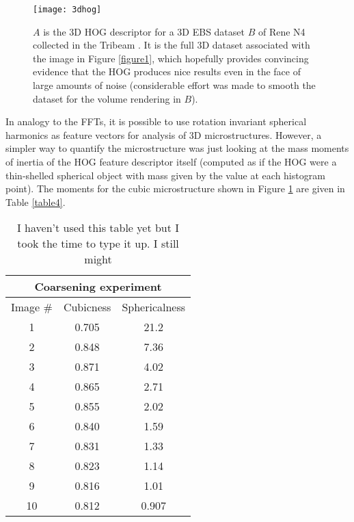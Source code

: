 \documentclass[review]{elsarticle}
\begin{document}
	\begin{figure}[!ht]
  		\centering
    	\texttt{[image: 3dhog]}
  		\caption{ $A$ is the 3D HOG descriptor for a 3D EBS dataset $B$ of Rene N4 collected in the Tribeam \cite{tribeam}. It is the full 3D dataset associated with the image in Figure \ref{figure1}, which hopefully provides convincing evidence that the HOG produces nice results even in the face of large amounts of noise (considerable effort was made to smooth the dataset for the volume rendering in $B$). }
  		\label{figure4}
	\end{figure}

	In analogy to the FFTs, it is possible to use rotation invariant spherical harmonics \cite{spherical} as feature vectors for analysis of 3D microstructures. However, a simpler way to quantify the microstructure was just looking at the mass moments of inertia of the HOG feature descriptor itself (computed as if the HOG were a thin-shelled spherical object with mass given by the value at each histogram point). The moments for the cubic microstructure shown in Figure \ref{figure4} are given in Table \ref{table4}.
	
    \begin{table}[h]
      \begin{center}
      \begin{tabular}{ c | c | c }
        \multicolumn{3}{c}{Coarsening experiment} \\
        \hline
        Image \# & Cubicness & Sphericalness \\
        \hline
        1 & 0.705 & 21.2 \\
        2 & 0.848 & 7.36 \\
        3 & 0.871 & 4.02 \\
        4 & 0.865 & 2.71 \\
        5 & 0.855 & 2.02 \\
        6 & 0.840 & 1.59 \\
        7 & 0.831 & 1.33 \\
        8 & 0.823 & 1.14 \\
        9 & 0.816 & 1.01 \\
        10 & 0.812 & 0.907 \\
        \hline
      \end{tabular}
	  \label{table3}
	  \caption{I haven't used this table yet but I took the time to type it up. I still might }
	  \end{center}
  	\end{table}
\end{document}
